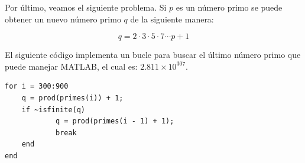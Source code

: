 Por último, veamos el siguiente problema. Si $p$ es un número primo se puede obtener un nuevo número primo $q$ de la siguiente manera:

\begin{equation}
    q = 2\cdot3\cdot5\cdot7\cdots p + 1 
\end{equation}


El siguiente código implementa un bucle para buscar el último número primo que puede manejar MATLAB, el cual es: $2.811\times10^{307}$.

\begin{lstlisting}[caption = {}, label = {}]
for i = 300:900
    q = prod(primes(i)) + 1;
    if ~isfinite(q)
            q = prod(primes(i - 1) + 1);
            break
    end
end
\end{lstlisting}








